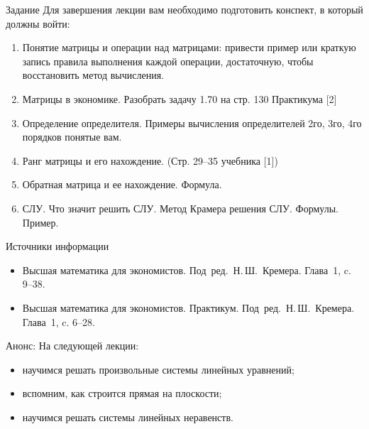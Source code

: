 \documentclass[unicode,11pt,notheorems]{beamer}
\begin{document}
\begin{frame}{Задание}
Для завершения лекции вам необходимо подготовить конспект, в который должны войти:
	\begin{enumerate}
		\item 
			Понятие матрицы и операции над матрицами: привести пример или краткую запись правила выполнения каждой операции, достаточную, чтобы восстановить метод вычисления.
		\item 
			Матрицы в экономике. Разобрать задачу 1.70 на стр. 130 Практикума [2]
		\item 
			Определение определителя. 
			Примеры вычисления определителей 2го, 3го, 4го порядков понятые вам. 
		\item 
			Ранг матрицы и его нахождение. (Стр. 29--35 учебника [1])
		\item 
			Обратная матрица и ее нахождение. Формула.
		\item 
			СЛУ. Что значит решить СЛУ. Метод Крамера решения СЛУ. Формулы. Пример.
	\end{enumerate}
\end{frame}
\begin{frame}{Источники информации}
\begin{itemize}
\item 
	Высшая математика для экономистов. Под~ред.~Н.\,Ш.~Кремера. Глава~1, c. 9--38.
\item 
	Высшая математика для экономистов. Практикум. Под~ред.~Н.\,Ш.~Кремера. Глава~1, c. 6--28.
	
\end{itemize}

\end{frame}

\begin{frame}{Анонс:}
	На следующей лекции:
	\begin{itemize}
	\item 
		научимся решать произвольные системы линейных уравнений;
	\item 
		вспомним, как строится прямая на плоскости;
	\item 
		научимся решать системы линейных неравенств.
	\end{itemize}

\end{frame}
\end{document}
